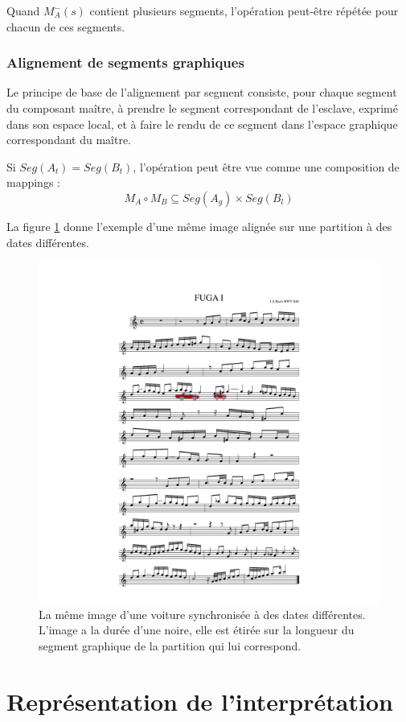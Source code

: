 \documentclass{article}
\newcommand{\seg}[1]			{Seg(#1)}
\begin{document}
Quand $M_A^{-}(s)$ contient plusieurs segments, l'opération peut-être répétée pour chacun de ces segments.

\subsubsection{Alignement de segments graphiques}

Le principe de base de l'alignement par segment consiste, pour chaque segment du composant maître, à prendre le segment correspondant de l'esclave, exprimé dans son espace local, et à faire le rendu de ce segment dans l'espace graphique correspondant du maître.

Si $\seg{A_t} = \seg{B_t}$, l'opération peut être vue comme une composition de mappings : 
\[
M_{A} \circ M_{B} \subseteq \seg{A_{g}}\times \seg{B_{l}}
\]

La figure \ref{fig:align} donne l'exemple d'une même image alignée sur une partition à des dates différentes.
\begin{figure}[htbp]
\centerline{
	\includegraphics[width=0.76\columnwidth]{imgs/synccars}}
\caption{La même image d'une voiture synchronisée à des dates différentes. L'image a la durée d'une noire, elle est étirée sur la longueur du segment graphique de la partition qui lui correspond.}
\label{fig:align}
\end{figure}

\section{Représentation de l'interprétation}
\end{document}
